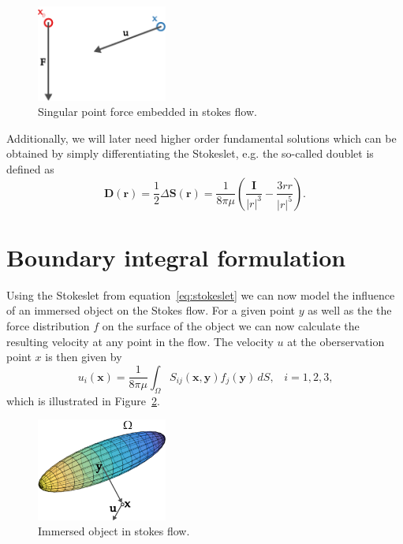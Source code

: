 \documentclass[a4paper,11pt]{kth-mag}
\begin{document}
\begin{figure}[!htbp]
  \centering
  \includegraphics[width=0.3819660112501450000000\textwidth]{img/stokeslet.pdf}
  \caption{Singular point force embedded in stokes flow.}
  \label{fig:stokeslet}
\end{figure}

Additionally, we will later need higher order fundamental solutions which can be obtained by simply differentiating the Stokeslet, e.g. the so-called doublet is defined as
\begin{equation}
  \label{eq:doublet}
  \mathbf{D}(\mathbf{r}) = \frac{1}{2} \Delta\mathbf{S}(\mathbf{r}) = \frac{1}{8\pi\mu} \left(\frac{\mathbf{I}}{|r|^3} - \frac{3rr}{|r|^5}\right) \text{.}
\end{equation}

\section{Boundary integral formulation}

Using the Stokeslet from equation~\eqref{eq:stokeslet} we can now model the influence of an immersed object on the Stokes flow. For a given point $y$ as well as the the force distribution $f$ on the surface of the object we can now calculate the resulting velocity at any point in the flow. The velocity $u$ at the oberservation point $x$ is then given by
\begin{equation}
  \label{eq:boundary_integral_formulation}
  u_i(\mathbf{x}) = \frac{1}{8\pi\mu}\int_{\Omega}S_{ij}(\mathbf{x},\mathbf{y})f_j(\mathbf{y}) \, dS \text{,} \quad i=1,2,3\text{,}
\end{equation}
which is illustrated in Figure~\ref{fig:immersed}.

\begin{figure}[!htbp]
  \centering
  \includegraphics[width=0.3819660112501450000000\textwidth]{img/immersed.pdf}
  \caption{Immersed object in stokes flow.}
  \label{fig:immersed}
\end{figure}
\end{document}

